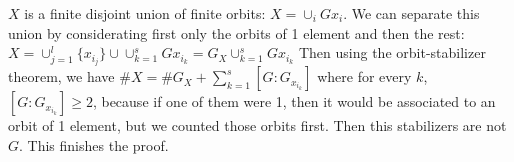 \documentclass[12pt]{article}
\begin{document}
$X$ is a finite disjoint union of finite orbits:
$X = \cup_{i}Gx_{i}$. We can separate this union by considerating first only the orbits of 1 element and then the rest:
$X = \cup_{j=1}^{l}\{x_{i_{j}}\} \cup \cup_{k=1}^{s}Gx_{i_{k}}=G_{X} \cup_{k=1}^{s}Gx_{i_{k}}$
Then using the orbit-stabilizer theorem, we have $\#X=\#G_{X} + \sum_{k=1}^{s}[G:G_{x_{i_{k}}}]$ where for every $k$, $[G:G_{x_{i_{k}}}]\geq 2$, because if one of them were 1, then it would be associated to an orbit of 1 element, but we counted those orbits first. Then this stabilizers are not $G$. This finishes the proof.
\end{document}
